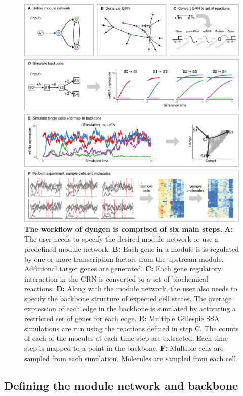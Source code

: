 \begin{figure}[htb!]
	\centering
	\includegraphics[width=\hugefigure]{fig/explain_methods} 
	\caption{\textbf{The workflow of dyngen is comprised of six main steps.} \textbf{A:} The user needs to specify the desired module network or use a predefined module network. \textbf{B:} Each gene in a module is is regulated by one or more transcription factors from the upstream module. Additional target genes are generated. \textbf{C:} Each gene regulatory interaction in the GRN is converted to a set of biochemical reactions. \textbf{D:} Along with the module network, the user also needs to specify the backbone structure of expected cell states. The average expression of each edge in the backbone is simulated by activating a restricted set of genes for each edge. \textbf{E:} Multiple Gillespie SSA simulations are run using the reactions defined in step C.  The counts of each of the mocules at each time step are extracted. Each time step is mapped to a point in the backbone. \textbf{F:} Multiple cells are sampled from each simulation. Molecules are sampled from each cell.}
	\label{fig:explain_methods}
\end{figure}

\subsection{Defining the module network and backbone}

